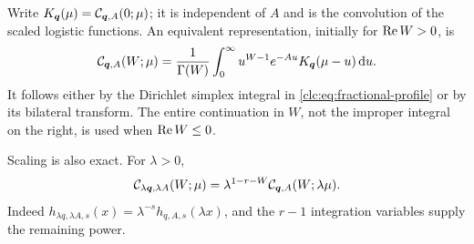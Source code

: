 Write $K_{\boldsymbol q}(\mu)=\mathcal C_{\boldsymbol q,A}(0;\mu)$; it is independent of $A$ and
is the convolution of the scaled logistic functions. An equivalent
representation, initially for $\operatorname{Re} W>0$, is
\begin{equation}\label{clc:eq:base-fractional}
 \mathcal C_{\boldsymbol q,A}(W;\mu)=\frac1{\Gamma(W)}
 \int_0^\infty u^{W-1}e^{-Au}K_{\boldsymbol q}(\mu-u)\,\mathrm d u.
\end{equation}
It follows either by the Dirichlet simplex integral in
\eqref{clc:eq:fractional-profile} or by its bilateral transform. The
entire continuation in $W$, not the improper integral on the right,
is used when $\operatorname{Re} W\le0$.

Scaling is also exact. For $\lambda>0$,
\begin{equation}\label{clc:eq:scaling}
 \mathcal C_{\lambda\boldsymbol q,\lambda A}(W;\mu)
 =\lambda^{1-r-W}\mathcal C_{\boldsymbol q,A}(W;\lambda\mu).
\end{equation}
Indeed $h_{\lambda q,\lambda A,s}(x)=\lambda^{-s}h_{q,A,s}(\lambda x)$,
and the $r-1$ integration variables supply the remaining power.
